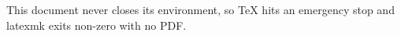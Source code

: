 \documentclass{article}
\begin{document}
This document never closes its environment, so TeX hits an emergency stop and
latexmk exits non-zero with no PDF.
\end{document}
